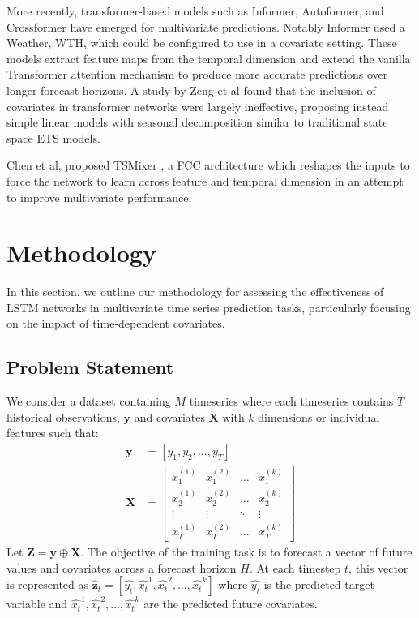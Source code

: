 \documentclass{article}
\newcommand{\horizon}{H}
\newcommand{\timeserieslength}{T}
\newcommand{\datasettscount}{M}
\begin{document}
More recently, transformer-based models such as Informer, Autoformer, and Crossformer
\cite{zhou2021informer,wu2022autoformer, zhang2023crossformer} have emerged for multivariate predictions. Notably Informer used a 
Weather, WTH,  which could be configured to use in a covariate setting. These models extract feature maps from the temporal dimension and extend the 
vanilla Transformer attention mechanism to produce more accurate predictions over longer forecast horizons. 
A study by Zeng et al \cite{zeng2022transformers} found that the inclusion of covariates in transformer networks were largely ineffective, proposing instead 
simple linear models with seasonal decomposition similar to traditional state space ETS models.

Chen et al, proposed TSMixer \cite{chen2023tsmixer}, a FCC architecture which reshapes the inputs to force the network to learn across feature and temporal dimension in an 
attempt to improve multivariate performance.

\section{Methodology}
In this section, we outline our methodology for assessing the effectiveness of LSTM networks in 
multivariate time series prediction tasks, particularly focusing on the impact of time-dependent covariates.

\subsection{Problem Statement}
We consider a dataset containing $\datasettscount$ timeseries where each timeseries contains $\timeserieslength$ historical observations, $\mathbf{y}$ 
and covariates $\mathbf{X}$ with $k$ dimensions or individual features such that:
\begin{align*}
\mathbf{y} &= [y_1, y_2, \dots, y_T] \\
\mathbf{X} &= \begin{bmatrix}
x_1^{(1)} & x_1^{(2)} & \ldots & x_1^{(k)} \\
x_2^{(1)} & x_2^{(2)} & \ldots & x_2^{(k)} \\
\vdots & \vdots & \ddots & \vdots \\
x_T^{(1)} & x_T^{(2)} & \ldots & x_T^{(k)}
\end{bmatrix}
\end{align*}
Let $\mathbf{Z} = \mathbf{y} \oplus \mathbf{X}$. The objective of the training task is to forecast a vector of future values and covariates across a forecast horizon $\horizon$. 
At each timestep $t$, this vector is represented as ${\mathbf{\hat{z}}_t} = [\hat{y_t}, \hat{x_t}^1, \hat{x_t}^2, \dots, \hat{x_t}^k]$ where $\hat{y_t}$ is the predicted target variable
and $\hat{x_t}^1, \hat{x_t}^2, \dots, \hat{x_t}^k$ are the predicted future covariates. 
\end{document}
